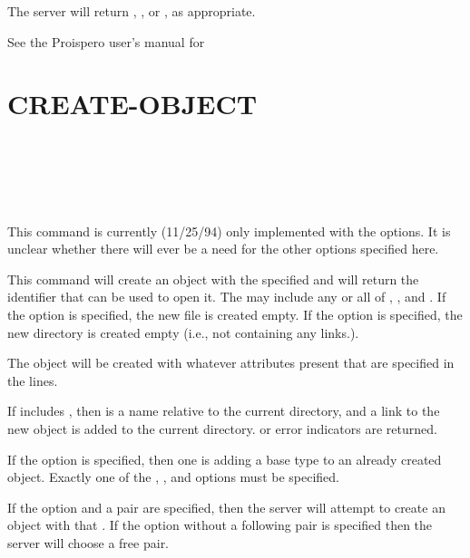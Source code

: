 The server will return , , or
, as appropriate.

See the Proispero user's manual for

\section{CREATE-OBJECT}

\begin{command}
  \commandsize \ors{}  
		\zoos{} \zooe \\ 
	\metaor {} 
		\zoos{} \zooe \\ 
	\metaor {} 
		\ore {} \\
	\zoms{}
	\zome \\
	\zoms{} \zome
\end{command}

This command is currently (11/25/94) only implemented with the
 options.  It is unclear whether there will
ever be a need for the other options specified here.

This command will create an object with the specified
 and will 
return the identifier that can be used to open it.   The
 may include any or all of 
, , and .
If the  option is specified, the new file is
created empty.    If the  option is specified, the
new directory is created empty (i.e., not containing any links.).  

The object will be created with whatever attributes present that are
specified in the  lines.

If  includes , then
 is a name relative to the current directory, and a
link to the new object is added to the current directory.
 or error indicators are returned.

If the  option is specified, then one is adding a base type to
an already created object.   Exactly one of the ,
, and  options must be specified.

\begin{sloppypar}
If the  option and a  
 pair are specified, then the server will attempt to create an object with that
 .  If the  option
without a following pair is
specified
then the server will choose a free 
 pair.
\end{sloppypar}

